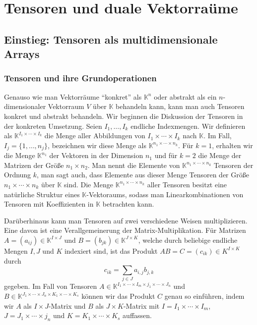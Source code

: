 \documentclass[
a4paper,landscape,16pt,
bibliography=totocnumbered,
numbers=noenddot,
]{scrartcl}
\numberwithin{equation}{subsection}
\newcommand{\K}{\mathbb K}
\theoremstyle{plain}
\theoremstyle{definition}
\begin{document}
\section{Tensoren und duale Vektorraüme} 

\subsection{Einstieg: Tensoren als multidimensionale Arrays} 

\subsubsection{Tensoren und ihre Grundoperationen}

Genauso wie man Vektorräume ``konkret'' als $\K^n$ oder abstrakt als ein $n$-dimensionaler Vektorraum $V$ über $\K$ behandeln kann, kann man auch Tensoren konkret und abstrakt behandeln. Wir beginnen die Diskussion der Tensoren in der konkreten Umsetzung. Seien $I_1,\ldots, I_k$ endliche Indexmengen. Wir definieren als $\K^{I_1 \times \cdots \times I_k}$ die Menge aller Abbildungen von $I_1 \times \cdots \times I_k$ nach $\K$. Im Fall, $I_j = \{1,\ldots, n_j\}$, bezeichnen wir diese Menge als $\K^{n_1 \times \cdots \times n_k}$. Für $k=1$, erhalten wir die Menge $\K^{n_1}$ der Vektoren in der Dimension $n_1$ und für $k=2$ die Menge der Matrizen der Größe $n_1 \times n_2$. Man nennt die Elemente von $\K^{n_1 \times \cdots \times n_k}$ Tensoren der Ordnung $k$, man sagt auch, dass Elemente aus dieser Menge Tensoren der Größe $n_1 \times \cdots \times n_k$ über $\K$ sind. Die Menge  $\K^{n_1 \times \cdots \times n_k}$ aller Tensoren besitzt eine natürliche Struktur eines $\K$-Vektoraums, sodass man Linearkombinationen von Tensoren mit Koeffizienten in $\K$ betrachten kann. 

Darüberhinaus kann man Tensoren auf zwei verschiedene Weisen multiplizieren. Eine davon ist eine Verallgemeinerung der Matrix-Multiplikation. Für Matrizen $A = (a_{ij}) \in \K^{I \times J}$ und $B = (b_{jk}) \in \K^{J \times K}$, welche durch beliebige endliche Mengen $I, J$ und $K$ indexiert sind, ist das Produkt $AB = C = (c_{ik}) \in K^{I \times K}$ durch 
\[
		c_{ik} = \sum_{j \in J} a_{i,j} b_{j,k}
\]
gegeben. Im Fall von Tensoren $A \in \K^{I_1 \times \cdots \times I_m \times j_1 \times \cdots \times J_n}$ und $B \in \K^{J_1 \times \cdots \times J_n \times K_1 \times \cdots \times K_s}$ können wir das Produkt $C$ genau so einführen, indem wir $A$ als $I \times J$-Matrix und $B$ als $J \times K$-Matrix mit $I = I_1 \times \cdots \times I_m$, $J= J_1 \times \cdots \times j_n$ und $K= K_1 \times \cdots \times K_s$ auffassen. 
\end{document}
